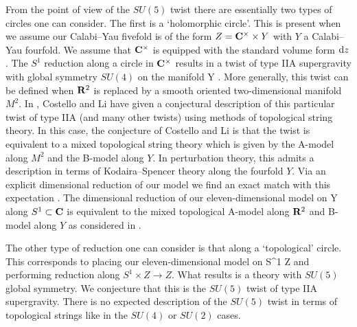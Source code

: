 \documentclass[../main.tex]{subfiles}
\begin{document}
From the point of view of the $SU(5)$ twist there are essentially two types of circles one can consider.
The first is a `holomorphic circle'.
This is present when we assume our Calabi--Yau fivefold is of the form $Z = \mathbf{C}^\times \times Y$ with $Y$ a Calabi--Yau fourfold.
We assume that $\mathbf{C}^\times$ is equipped with the standard volume form $\mathrm{d} z$.
The $S^1$ reduction along a circle in $\mathbf{C}^\times$ results in a twist of type IIA supergravity with global symmetry $SU(4)$ on the manifold
\beqn
\R \times \R \times Y .
\eeqn
More generally, this twist can be defined when $\mathbf{R}^2$ is replaced by a smooth oriented two-dimensional manifold $M^2$.
In \cite{CLsugra}, Costello and Li have given a conjectural description of this particular twist of type IIA (and many other twists) using methods of topological string theory.
In this case, the conjecture of Costello and Li is that the twist is equivalent to a mixed topological string theory which is given by the A-model along $M^2$ and the B-model along $Y$.
In perturbation theory, this admits a description in terms of Kodaira--Spencer theory along the fourfold $Y$.
Via an explicit dimensional reduction of our model we find an exact match with this expectation \cite{RSW}.
The dimensional reduction of our eleven-dimensional model on
\beqn
\R \times \C \times Y
\eeqn
along $S^1 \subset \mathbf{C}$ is equivalent to the mixed topological A-model along $\mathbf{R}^2$ and B-model along $Y$ as considered in \cite{CLsugra}.

The other type of reduction one can consider is that along a `topological' circle.
This corresponds to placing our eleven-dimensional model on
\beqn
S^1 \times Z
\eeqn
and performing reduction along $S^1 \times Z \to Z$.
What results is a theory with $SU(5)$ global symmetry.
We conjecture that this is the $SU(5)$ twist of type IIA supergravity.
There is no expected description of the $SU(5)$ twist in terms of topological strings like in the $SU(4)$ or $SU(2)$ cases.

%
%
\end{document}

